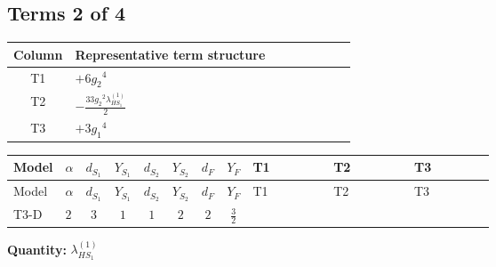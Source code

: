 \documentclass[8pt]{article}
\begin{document}
\begin{landscape}
\subsection*{Terms 2 of 4}
\begin{center}
\begin{tabular}{@{}c >{\raggedright\arraybackslash}p{0.82\linewidth}@{}}
\toprule
Column & Representative term structure \\
\midrule
T1 & \(\displaystyle +6 {g_2}^4\) \\
\midrule
T2 & \(\displaystyle -\frac{33 {g_2}^2 {\lambda_{HS_1}^{(1)}}}{2}\) \\
\midrule
T3 & \(\displaystyle +3 {g_1}^4\) \\
\midrule
\bottomrule
\end{tabular}
\end{center}
\smallskip
\tiny
\begin{longtable}{@{}llcccccc >{\raggedright\arraybackslash}p{0.21\linewidth} >{\raggedright\arraybackslash}p{0.21\linewidth} >{\raggedright\arraybackslash}p{0.21\linewidth}@{}}
\toprule
Model & $\alpha$ & $d_{S_1}$ & $Y_{S_1}$ & $d_{S_2}$ & $Y_{S_2}$ & $d_F$ & $Y_F$ & T1 & T2 & T3 \\
\midrule
\endfirsthead
\toprule
Model & $\alpha$ & $d_{S_1}$ & $Y_{S_1}$ & $d_{S_2}$ & $Y_{S_2}$ & $d_F$ & $Y_F$ & T1 & T2 & T3 \\
\midrule
\endhead
T3-D & $2$ & $3$ & $1$ & $1$ & $2$ & $2$ & $\frac{3}{2}$ & \scriptsize\adjustbox{max width=\linewidth}{$\begin{gathered} +6 {g_2}^4\end{gathered}$} & \scriptsize\adjustbox{max width=\linewidth}{$\begin{gathered} -\frac{33 {g_2}^2 {\lambda_{HS_1}^{(1)}}}{2}\end{gathered}$} & \scriptsize\adjustbox{max width=\linewidth}{$\begin{gathered} +3 {g_1}^4\end{gathered}$} \\
\midrule
\bottomrule
\end{longtable}
\clearpage
\noindent\textbf{Quantity: }$\lambda_{HS_1}^{(1)}$\par\smallskip

\end{landscape}
\end{document}
